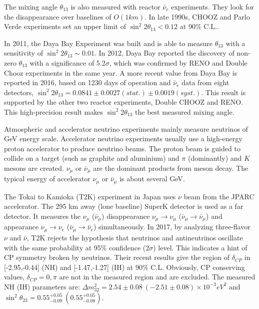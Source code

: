 \documentclass[preprint,12pt]{elsarticle}
\numberwithin{equation}{section}
\begin{document}
The mixing angle $\theta_{13}$ is also measured with reactor $\bar{\nu}_e$ experiments. They look for the disappearance over baselines of $O(1 km)$. In late 1990s, CHOOZ and Parlo Verde experiments set an upper limit of $\sin^2 2\theta_{13}<0.12$ at 90\% C.L.\cite{joseTextbook}.

In 2011, the Daya Bay Experiment was built and is able to measure $\theta_{13}$ with a sensitivity of $\sin^2 2\theta_{13}\sim 0.01$.
In 2012, Daya Bay reported the discovery of non-zero $\theta_{13}$ with a significance of 5.2$\sigma$, which was confirmed by RENO and Double Chooz experiments in the same year. A more recent value from Daya Bay is reported in 2016\cite{dayabayresults}, based on 1230 days of operation and $\bar{\nu}_e$ data from eight detectors, $\sin^2 2\theta_{13} = 0.0841\pm0.0027(stat.)\pm0.0019(syst.)$. This result is supported by the other two reactor experiments, Double CHOOZ and RENO. This high-precision result makes $\sin^2 2\theta_{13}$ the best measured mixing angle\cite{reactorNu}.

Atmospheric and accelerator neutrino experiments mainly measure neutrinos of GeV energy scale. Accelerator neutrino experiments usually use a high-energy proton accelerator to produce neutrino beams. The proton beam is guided to collide on a target (such as graphite and aluminium) and $\pi$ (dominantly) and $K$ mesons are created. $\nu_\mu$ or $\bar{\nu}_\mu$ are the dominant products from meson decay. The typical energy of accelerator $\nu_\mu$ or $\bar{\nu}_\mu$ is about several GeV\cite{stateofart}.

The Tokai to Kamioka (T2K) experiment in Japan uses $\nu$ beam from the JPARC accelerator. The 295 km away (lone baseline) SuperK detector is used as a far detector. It measures the $\nu_\mu$ ($\bar\nu_\mu$) disappearance $\nu_\mu\to\nu_\mu$ ($\bar{\nu}_\mu\to\bar{\nu}_\mu$) and appearance $\nu_\mu\to\nu_e$ ($\bar{\nu}_\mu\to\bar{\nu}_e$) simultaneously. In 2017, by analyzing three-flavor $\nu$ and $\bar{\nu}$, T2K rejects the hypothesis that neutrinos and antineutrinos oscillate with the same probability at 95\% confidence (2$\sigma$) level. This indicates a hint of CP symmetry broken by neutrinos. Their recent results give the region of $\delta_{CP}$ in [-2.95,-0.44] (NH) and [-1.47,-1.27] (IH) at 90\% C.L. Obviously, CP conserving values, $\delta_{CP} = 0,\pi$ are not in the measured region and are excluded. The measured NH (IH) parameters are: $\Delta m^2_{32}=2.54\pm 0.08~(-2.51\pm0.08)\times 10^{-3} eV^2$ and $\sin^2\theta_{23} = 0.55^{+0.05}_{-0.09}~(0.55^{+0.05}_{-0.08})$\cite{t2k}.
\end{document}
